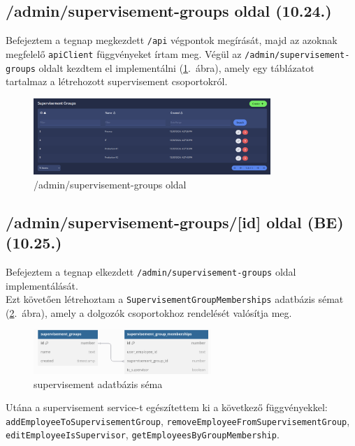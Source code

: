 \documentclass[a4paper]{article}
\newcommand{\inltxt}[1]{\texttt{#1}}
\begin{document}
\subsection{/admin/supervisement-groups oldal (10.24.)}

Befejeztem a tegnap megkezdett \inltxt{/api} végpontok megírását, majd az azoknak megfelelő \inltxt{apiClient}
függvényeket írtam meg. Végül az \inltxt{/admin/supervisement-groups} oldalt kezdtem el
implementálni (\ref{fig:sup_groups}.~ábra), amely egy táblázatot tartalmaz a létrehozott supervisement csoportokról.

\begin{figure}[ht]
  \centering
  \includegraphics[width = 0.8\textwidth]{images/sup_groups.png}
  \caption{/admin/supervisement-groups oldal}
  \label{fig:sup_groups}
\end{figure}

\subsection{/admin/supervisement-groups/[id] oldal (BE) (10.25.)}

Befejeztem a tegnap elkezdett \inltxt{/admin/supervisement-groups} oldal imp\-le\-men\-tá\-lás\-át. \\

Ezt követően létrehoztam a \inltxt{SupervisementGroupMemberships} adatbázis sémat (\ref{fig:sup_schema}.~ábra), amely a
dolgozók csoportokhoz rendelését valósítja meg.

\begin{figure}[ht]
  \centering
  \includegraphics[width = 0.6\textwidth]{images/sm2.png}
  \caption{supervisement adatbázis séma}
  \label{fig:sup_schema}
\end{figure}

Utána a supervisement service-t egészítettem ki a következő függvényekkel:
\inltxt{addEmployeeToSupervisementGroup}, \inltxt{removeEmployeeFromSupervisementGroup},
\inltxt{editEmployeeIsSupervisor}, \inltxt{getEmployeesByGroupMembership}.\\
\end{document}
